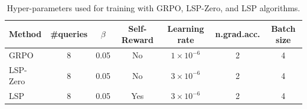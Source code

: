 \documentclass[]{fairmeta}
\begin{document}
\begin{table}
\centering
\begin{tabular}{lcccccc}
\hline
Method & \#queries & $\beta$ & Self-Reward & Learning rate & n.grad.acc. & Batch size \\
\hline
GRPO & 8 & 0.05 & No & $1\times10^{-6}$ & 2  & 4 \\
LSP-Zero   & 8 & 0.05 & No & $3\times10^{-6}$ & 2  & 4  \\
LSP  & 8 & 0.05 & Yes & $3\times10^{-6}$ & 2 &  4  \\
\hline
\end{tabular}
\label{tab:hyperparams-grpo}
\caption{Hyper-parameters used for training with GRPO, LSP-Zero, and LSP algorithms.}
\end{table}
\end{document}
